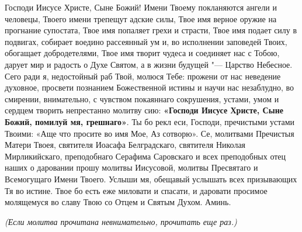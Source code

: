 \begin{mymulticols}

Господи Иисусе Христе, Сыне Божий! Имени Твоему покланяются ангели и человецы, Твоего имени трепещут адские силы, Твое имя верное оружие на прогнание супостата, Твое имя попаляет грехи и страсти, Твое имя подает силу в подвигах, собирает воедино рассеянный ум и, во исполнении заповедей Твоих, обогащает добродетелями, Твое имя творит чудеса и соединяет нас с Тобою, дарует мир и радость о Духе Святом, а в жизни будущей "--- Царство Небесное. Сего ради я, недостойный раб Твой, молюся Тебе: прожени от нас неведение духовное, просвети познанием Божественной истины и научи нас незаблудно, во смирении, внимательно, с чувством покаяннаго сокрушения, устами, умом и сердцем творить непрестанно молитву сию: \textbf{«Господи Иисусе Христе, Сыне Божий, помилуй мя, грешнаго»}. Ты бо рекл еси, Господи, пречистыми устами Твоими: «Аще что просите во имя Мое, Аз сотворю». Се, молитвами Пречистыя Матери Твоея, святителя Иоасафа Белградскаго, святителя Николая Мирликийскаго, преподобнаго Серафима Саровскаго и всех преподобных отец наших о даровании прошу молитвы Иисусовой,  молитвы  Пресвятаго и Всемогущаго Имени Твоего. Услыши мя, обещавый услышать всех призывающих Тя во истине. Твое бо есть еже миловати и спасати, и даровати просимое молящемуся во славу Твою со Отцем и Святым Духом. Аминь. 


\end{mymulticols}



{\centering\emph{(Если молитва прочитана невнимательно, прочитать еще раз.)}\par}


\mychapterending

 

